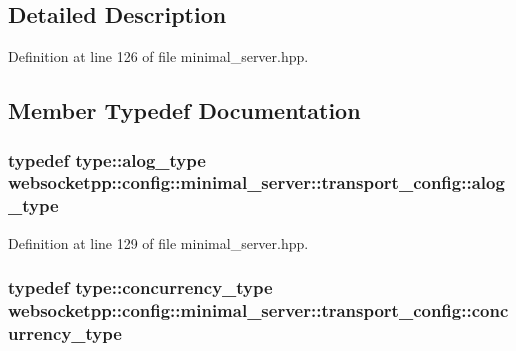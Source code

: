 \subsection{Detailed Description}


Definition at line 126 of file minimal\+\_\+server.\+hpp.



\subsection{Member Typedef Documentation}
\hypertarget{structwebsocketpp_1_1config_1_1minimal__server_1_1transport__config_a09acf498effc5c29b26e50a98ce2b8e9}{}
\subsubsection[{alog\+\_\+type}]{\setlength{\rightskip}{0pt plus 5cm}typedef {\bf type\+::alog\+\_\+type} {\bf websocketpp\+::config\+::minimal\+\_\+server\+::transport\+\_\+config\+::alog\+\_\+type}}\label{structwebsocketpp_1_1config_1_1minimal__server_1_1transport__config_a09acf498effc5c29b26e50a98ce2b8e9}


Definition at line 129 of file minimal\+\_\+server.\+hpp.

\hypertarget{structwebsocketpp_1_1config_1_1minimal__server_1_1transport__config_a753cbfdd821f9a6643ba8ee70d4834e6}{}
\subsubsection[{concurrency\+\_\+type}]{\setlength{\rightskip}{0pt plus 5cm}typedef {\bf type\+::concurrency\+\_\+type} {\bf websocketpp\+::config\+::minimal\+\_\+server\+::transport\+\_\+config\+::concurrency\+\_\+type}}\label{structwebsocketpp_1_1config_1_1minimal__server_1_1transport__config_a753cbfdd821f9a6643ba8ee70d4834e6}


